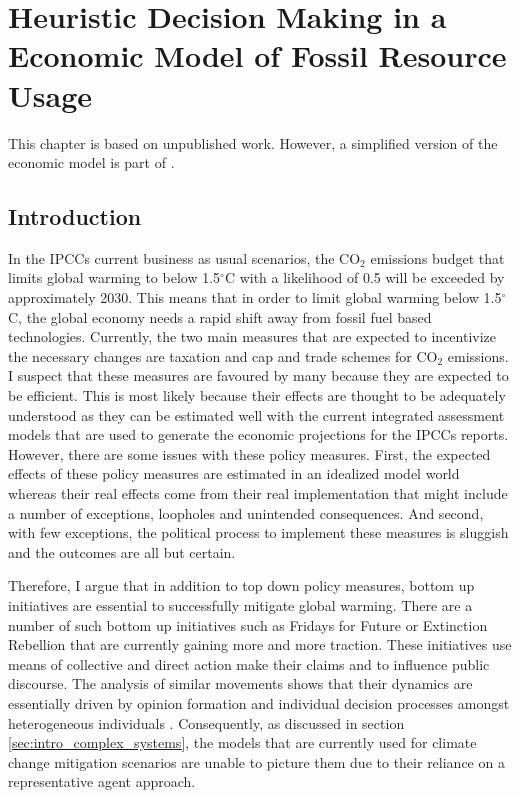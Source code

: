 \chapter{Heuristic Decision Making in a Economic Model of Fossil Resource Usage}
\label{chapter:heuristics}
This chapter is based on unpublished work. However, a simplified version of the economic model is part of \citep[P5]{Kolb2019b}.
\section{Introduction}

In the IPCCs current business as usual scenarios, the CO$_{2}$ emissions budget that limits global warming to below 1.5$^{\circ}$C with a likelihood of 0.5 will be exceeded by approximately 2030. This means that in order to limit global warming below 1.5$^{\circ}$C, the global economy needs a rapid shift away from fossil fuel based technologies. Currently, the two main measures that are expected to incentivize the necessary changes are taxation and cap and trade schemes for CO$_{2}$ emissions. I suspect that these measures are favoured by many because they are expected to be efficient. This is most likely because their effects are thought to be adequately understood as they can be estimated well with the current integrated assessment models that are used to generate the economic projections for the IPCCs reports. However, there are some issues with these policy measures. First, the expected effects of these policy measures are estimated in an idealized model world whereas their real effects come from their real implementation that might include a number of exceptions, loopholes and unintended consequences. And second, with few exceptions, the political process to implement these measures is sluggish and the outcomes are all but certain.

Therefore, I argue that in addition to top down policy measures, bottom up initiatives are essential to successfully mitigate global warming. 
There are a number of such bottom up initiatives such as Fridays for Future or Extinction Rebellion that are currently gaining more and more traction. These initiatives use means of collective and direct action make their claims and to influence public discourse. The analysis of similar movements shows that their dynamics are essentially driven by opinion formation and individual decision processes amongst heterogeneous individuals \citep{Graeber2009, Engler2016}. Consequently, as discussed in section \ref{sec:intro_complex_systems}, the models that are currently used for climate change mitigation scenarios are unable to picture them due to their reliance on a representative agent approach.

